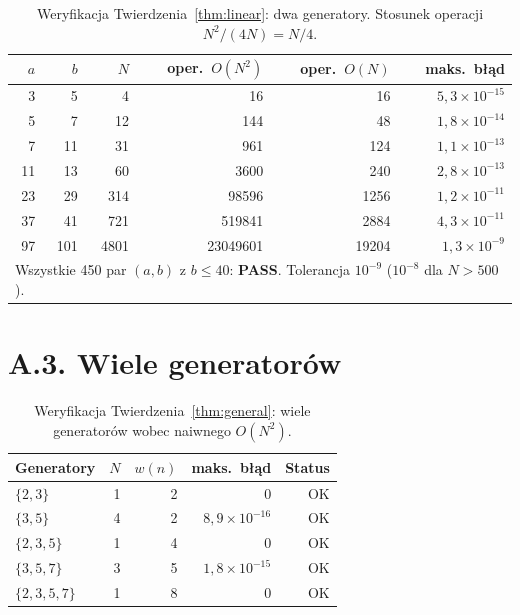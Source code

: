 \begin{table}[H]
\centering
\begin{tabular}{rrrrrr}
\toprule
$a$ & $b$ & $N$ & oper.\ $O(N^2)$ & oper.\ $O(N)$ & maks.\ błąd \\
\midrule
  3 &   5 &     4 &          16 &        16 & $5{,}3\times10^{-15}$ \\
  5 &   7 &    12 &         144 &        48 & $1{,}8\times10^{-14}$ \\
  7 &  11 &    31 &         961 &       124 & $1{,}1\times10^{-13}$ \\
 11 &  13 &    60 &        3600 &       240 & $2{,}8\times10^{-13}$ \\
 23 &  29 &   314 &       98596 &      1256 & $1{,}2\times10^{-11}$ \\
 37 &  41 &   721 &      519841 &      2884 & $4{,}3\times10^{-11}$ \\
 97 & 101 &  4801 &   23049601 &     19204 & $1{,}3\times10^{-9}$  \\
\bottomrule
\multicolumn{6}{l}{\footnotesize Wszystkie 450 par $(a,b)$ z $b \leq 40$: \textbf{PASS}.
  Tolerancja $10^{-9}$ ($10^{-8}$ dla $N > 500$).}
\end{tabular}
\caption{Weryfikacja Twierdzenia~\ref{thm:linear}: dwa generatory.
Stosunek operacji $N^2/(4N) = N/4$.}
\label{tab:two-gen}
\end{table}


\section*{A.3. Wiele generatorów}
\label{subsec:a3-wiele}

\begin{table}[H]
\centering
\begin{tabular}{lrrrr}
\toprule
Generatory & $N$ & $w(n)$ & maks.\ błąd & Status \\
\midrule
$\{2,3\}$     & 1 & 2 & $0$                   & OK \\
$\{3,5\}$     & 4 & 2 & $8{,}9\times10^{-16}$ & OK \\
$\{2,3,5\}$   & 1 & 4 & $0$                   & OK \\
$\{3,5,7\}$   & 3 & 5 & $1{,}8\times10^{-15}$ & OK \\
$\{2,3,5,7\}$ & 1 & 8 & $0$                   & OK \\
\bottomrule
\end{tabular}
\caption{Weryfikacja Twierdzenia~\ref{thm:general}: wiele generatorów
wobec naiwnego $O(N^2)$.}
\label{tab:multi-gen}
\end{table}

